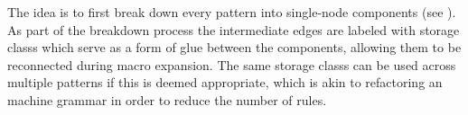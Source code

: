 {%
%      
%
%        
%        
%
%
%        
%        
%

The idea is to first break down every \gls{pattern} into single-\gls{node}
components (see ).
%
As part of the
breakdown process the intermediate \glspl{edge} are labeled with \glspl{storage
class} which serve as a form of glue between the components, allowing them to be
reconnected during \gls{macro expansion}.
%
The same \glspl{storage class} can be
used across multiple \glspl{pattern} if this is deemed appropriate, which is
akin to \gls{refactoring} an \gls{machine grammar} in order to reduce
the number of \glspl{rule}.

}

